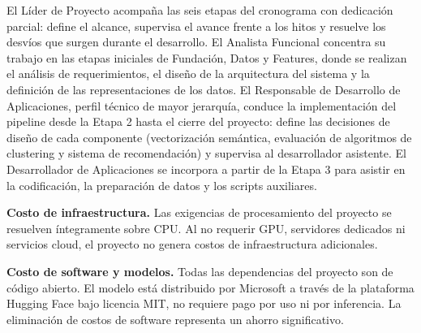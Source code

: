 \begin{table}[h]
\centering
\caption{Composición del equipo profesional y costo humano del proyecto, según escala COPAIPA (enero 2026).}
\label{tab:costo-humano}
\end{table}

El Líder de Proyecto acompaña las seis etapas del cronograma con dedicación parcial: define el alcance, supervisa el avance frente a los hitos y resuelve los desvíos que surgen durante el desarrollo. El Analista Funcional concentra su trabajo en las etapas iniciales de Fundación, Datos y Features, donde se realizan el análisis de requerimientos, el diseño de la arquitectura del sistema y la definición de las representaciones de los datos. El Responsable de Desarrollo de Aplicaciones, perfil técnico de mayor jerarquía, conduce la implementación del pipeline desde la Etapa 2 hasta el cierre del proyecto: define las decisiones de diseño de cada componente (vectorización semántica, evaluación de algoritmos de clustering y sistema de recomendación) y supervisa al desarrollador asistente. El Desarrollador de Aplicaciones se incorpora a partir de la Etapa 3 para asistir en la codificación, la preparación de datos y los scripts auxiliares.

\textbf{Costo de infraestructura.} Las exigencias de procesamiento del proyecto se resuelven íntegramente sobre CPU. Al no requerir GPU, servidores dedicados ni servicios cloud, el proyecto no genera costos de infraestructura adicionales.

\textbf{Costo de software y modelos.} Todas las dependencias del proyecto son de código abierto. El modelo está distribuido por Microsoft a través de la plataforma Hugging Face bajo licencia MIT, no requiere pago por uso ni por inferencia. La eliminación de costos de software representa un ahorro significativo.

